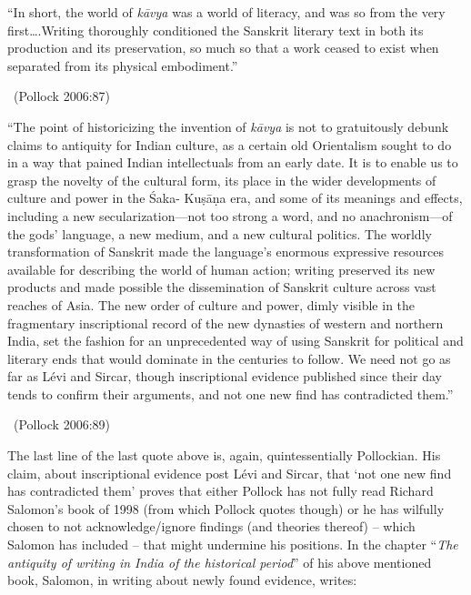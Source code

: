 \begin{myquote}
“In short, the world of \textit{kāvya} was a world of literacy, and was so from the very first….Writing thoroughly conditioned the Sanskrit literary text in both its production and its preservation, so much so that a work ceased to exist when separated from its physical embodiment.”

~\hfill (Pollock 2006:87)
\end{myquote}

\begin{myquote}
“The point of historicizing the invention of \textit{kāvya} is not to gratuitously debunk claims to antiquity for Indian culture, as a certain old Orientalism sought to do in a way that pained Indian intellectuals from an early date. It is to enable us to grasp the novelty of the cultural form, its place in the wider developments of culture and power in the Śaka- Kuṣāṇa era, and some of its meanings and effects, including a new secularization—not too strong a word, and no anachronism—of the gods’ language, a new medium, and a new cultural politics. The worldly transformation of Sanskrit made the language’s enormous expressive resources available for describing the world of human action; writing preserved its new products and made possible the dissemination of Sanskrit culture across vast reaches of Asia. The new order of culture and power, dimly visible in the fragmentary inscriptional record of the new dynasties of western and northern India, set the fashion for an unprecedented way of using Sanskrit for political and literary ends that would dominate in the centuries to follow. We need not go as far as Lévi and Sircar, though inscriptional evidence published since their day tends to confirm their arguments, and not one new find has contradicted them.”

~\hfill (Pollock 2006:89)
\end{myquote}

The last line of the last quote above is, again, quintessentially Pollockian. His claim, about inscriptional evidence post Lévi and Sircar, that ‘not one new find has contradicted them’ proves that either Pollock has not fully read Richard Salomon’s book of 1998 (from which Pollock quotes though) or he has wilfully chosen to not acknowledge/ignore findings (and theories thereof) – which Salomon has included – that might undermine his positions. In the chapter “\textit{The antiquity of writing in India of the historical period}” of his above mentioned book, Salomon, in writing about newly found evidence, writes:

